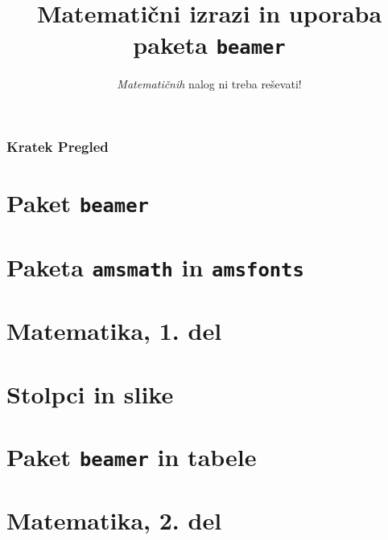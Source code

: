 \documentclass{beamer}
\theoremstyle{definition}
\theoremstyle{plain}
\begin{document}
\title{Matematični izrazi in uporaba paketa \texttt{beamer}}
\subtitle{\emph{Matematičnih} nalog ni treba reševati!}
\date{}


\begin{frame}
    \frametitle{Kratek Pregled}
    \tableofcontents %
\end{frame}

\section{Paket \texttt{beamer}}



\section{Paketa \texttt{amsmath} in \texttt{amsfonts}}

% 

\section[Matematika, 1. del\\\large{Analiza, logika, množice}]{Matematika, 1. del}



\section{Stolpci in slike}

\section{Paket \texttt{beamer} in tabele}

\section[Matematika, 2. del\\\large{Zaporedja, algebra, grupe}]{Matematika, 2. del}
\end{document}
